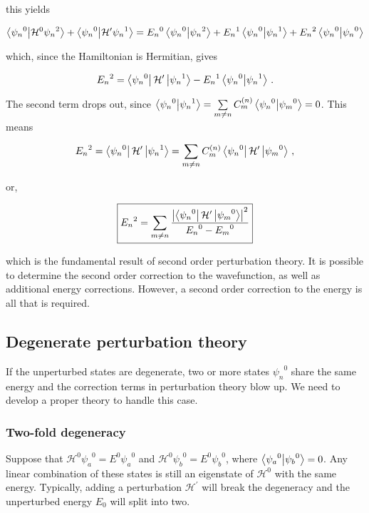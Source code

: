 \documentclass[12pt, titlepage]{article}
\begin{document}
this yields

\begin{equation}
	\bra{{\psi_n}^0}\ket{\mathcal{H}^0{\psi_n}^2} + \bra{{\psi_n}^0}\ket{\mathcal{H}^\prime{\psi_n}^1} = {E_n}^0\bra{{\psi_n}^0}\ket{{\psi_n}^2} + {E_n}^1\bra{{\psi_n}^0}\ket{{\psi_n}^1} + {E_n}^2\bra{{\psi_n}^0}\ket{{\psi_n}^0}
\end{equation}

which, since the Hamiltonian is Hermitian, gives

\begin{equation*}
	{E_n}^2 = \bra{{\psi_n}^0}\mathcal{H}^\prime\ket{{\psi_n}^1} - {E_n}^1\bra{{\psi_n}^0}\ket{{\psi_n}^1} \,.
\end{equation*}

The second term drops out, since $\bra{{\psi_n}^0}\ket{{\psi_n}^1} = \sum\limits_{m \neq n} C_{m}^{(n)}\bra{{\psi_n}^0}\ket{{\psi_m}^0} = 0$. This means

\begin{equation*}
	{E_n}^2 = \bra{{\psi_n}^0}\mathcal{H}^\prime\ket{{\psi_n}^1} = \sum_{m \neq n}C_{m}^{(n)}\bra{{\psi_n}^0}\mathcal{H}^\prime\ket{{\psi_m}^0} \,,
\end{equation*}

or,

\begin{equation}
	\boxed{ {E_n}^2 = \sum_{m \neq n}\frac{\qty|\bra{{\psi_n}^0}\mathcal{H}^\prime\ket{{\psi_m}^0}|^2}{{E_n}^0 - {E_m}^0}}
\end{equation}

which is the fundamental result of second order perturbation theory. It is possible to determine the second order correction to the wavefunction, as well as additional energy corrections. However, a second order correction to the energy is all that is required.

\subsection{Degenerate perturbation theory}
If the unperturbed states are degenerate, two or more states ${\psi_n}^0$ share the same energy and the correction terms in perturbation theory blow up. We need to develop a proper theory to handle this case.

\subsubsection{Two-fold degeneracy}
Suppose that $\mathcal{H}^0{\psi_a}^0 = E^0{\psi_a}^0$ and $\mathcal{H}^0{\psi_b}^0 = E^0{\psi_b}^0$, where $\bra{{\psi_a}^0}\ket{{\psi_b}^0} = 0$. Any linear combination of these states is still an eigenstate of $\mathcal{H}^0$ with the same energy. Typically, adding a perturbation $\mathcal{H}^\prime$ will break the degeneracy and the unperturbed energy $E_0$ will split into two.
\end{document}
